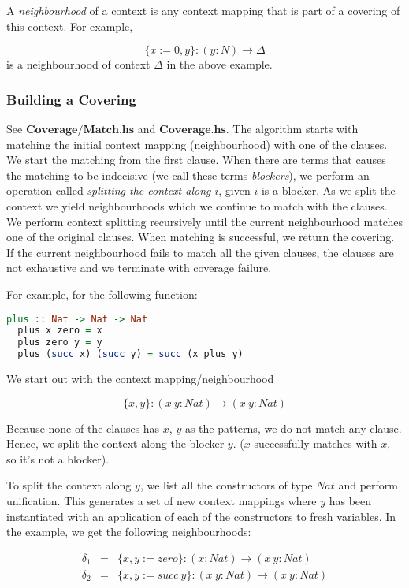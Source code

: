 A \textit{neighbourhood} of a context is any context mapping that is part of a covering of this context. For example, 

\[
  \{x := 0, y\} : (y : N) \to \Delta
\] is a neighbourhood of context $\Delta$ in the above example.

\subsubsection{Building a Covering} 

See $\boldsymbol{Coverage/Match.hs}$ and $\boldsymbol{Coverage.hs}$. The algorithm starts with matching the initial context mapping (neighbourhood) with one of the clauses. We start the matching from the first clause. When there are terms that causes the matching to be indecisive (we call these terms \textit{blockers}), we perform an operation called \textit{splitting the context along $i$}, given $i$ is a blocker. As we split the context we yield neighbourhoods which we continue to match with the clauses. We perform context splitting recursively until the current neighbourhood matches one of the original clauses. When matching is successful, we return the covering. If the current neighbourhood fails to match all the given clauses, the clauses are not exhaustive and we terminate with coverage failure.

For example, for the following function:

\begin{lstlisting}[language=haskell]
  plus :: Nat -> Nat -> Nat
  plus x zero = x
  plus zero y = y
  plus (succ x) (succ y) = succ (x plus y)
\end{lstlisting}

We start out with the context mapping/neighbourhood

\[
  \{x,y\} : (x \ y : Nat) \to (x \ y : Nat)
\]

Because none of the clauses has $x$, $y$ as the patterns, we do not match any clause. Hence, we split the context along the blocker $y$. ($x$ successfully matches with $x$, so it's not a blocker). 
 
To split the context along $y$, we list all the constructors of type $Nat$ and perform unification. This generates a set of new context mappings where $y$ has been instantiated with an application of each of the constructors to fresh variables. In the example, we get the following neighbourhoods:

\begin{figure}[H]
  \begin{equation*}
    \begin{aligned}
      \delta_1 & = & \{x, y := zero\} : (x : Nat) \to (x \ y : Nat) \\
      \delta_2 & = & \{x, y := succ \ y\} : (x \ y : Nat) \to (x \ y : Nat) \\
    \end{aligned}
  \end{equation*}
\end{figure}

